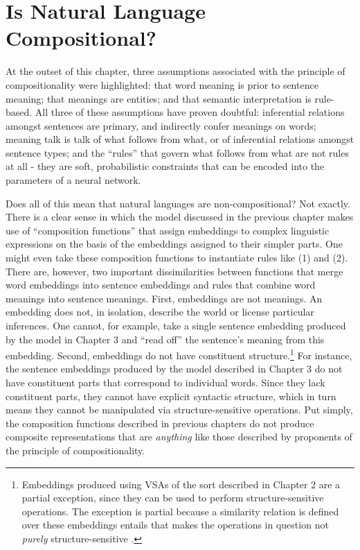 \section{Is Natural Language Compositional?}

At the outset of this chapter, three assumptions associated with the principle of compositionality were highlighted: that word meaning is prior to sentence meaning; that meanings are entities; and that semantic interpretation is rule-based. All three of these assumptions have proven doubtful: inferential relations amongst sentences are primary, and indirectly confer meanings on words; meaning talk is talk of what follows from what, or of inferential relations amongst sentence types; and the ``rules'' that govern what follows from what are not rules at all - they are soft, probabilistic constraints that can be encoded into the parameters of a neural network. 

Does all of this mean that natural languages are non-compositional? Not exactly. There is a clear sense in which the model discussed in the previous chapter makes use of ``composition functions'' that assign embeddings to complex linguistic expressions on the basis of the embeddings assigned to their simpler parts. One might even take these composition functions to instantiate rules like (1) and (2). There are, however, two important dissimilarities between functions that merge word embeddings into sentence embeddings and rules that combine word meanings into sentence meanings. First, embeddings are not meanings. An embedding does not, in isolation, describe the world or license particular inferences. One cannot, for example, take a single sentence embedding produced by the model in Chapter 3 and ``read off'' the sentence's meaning from this embedding. Second, embeddings do not have constituent structure.\footnote{Embeddings produced using VSAs of the sort described in Chapter 2 are a partial exception, since they can be used to perform structure-sensitive operations. The exception is partial because a similarity relation is defined over these embeddings entails that makes the operations in question not \textit{purely} structure-sensitive \citep{Plate:2003,Eliasmith:2013}.} For instance, the sentence embeddings produced by the model described in Chapter 3 do not have constituent parts that correspond to individual words. Since they lack constituent parts, they cannot have explicit syntactic structure, which in turn means they cannot be manipulated via structure-sensitive operations. Put simply, the composition functions described in previous chapters do not produce composite representations that are \textit{anything} like those described by proponents of the principle of compositionality.

